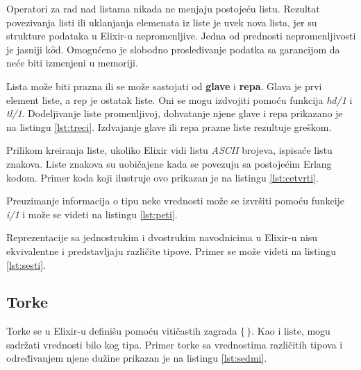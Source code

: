 \documentclass[12pt,oneside]{memoir}
\begin{document}


Operatori za rad nad listama nikada ne menjaju postojeću listu. Rezultat povezivanja listi ili uklanjanja elemenata iz liste je uvek nova lista, jer su strukture podataka u Elixir-u nepromenljive. Jedna od prednosti nepromenljivosti je jasniji k$\hat{o}$d. Omogućeno je slobodno prosleđivanje podatka sa garancijom da neće biti izmenjeni u memoriji.

Lista može biti prazna ili se može sastojati od \textbf{glave} i \textbf{repa}. Glava je prvi element liste, a rep je ostatak liste. Oni se mogu izdvojiti pomoću funkcija \textit{hd/1} i \textit{tl/1}. Dodeljivanje liste promenljivoj, dohvatanje njene glave i repa prikazano je na listingu \ref{lst:treci}. Izdvajanje glave ili repa prazne liste rezultuje greškom.



Prilikom kreiranja liste, ukoliko Elixir vidi listu \textit{ASCII} brojeva, ispisaće listu znakova. Liste znakova su uobičajene kada se povezuju sa postojećim Erlang kodom. Primer koda koji ilustruje ovo prikazan je na listingu \ref{lst:cetvrti}.



 

Preuzimanje informacija o tipu neke vrednosti može se izvršiti pomoću funkcije \textit{i/1} i može se videti na listingu \ref{lst:peti}.



Reprezentacije sa jednostrukim i dvostrukim navodnicima u Elixir-u nisu ekvivalentne i predstavljaju različite tipove. Primer se može videti na listingu \ref{lst:sesti}.



\subsection{Torke}

Torke se u Elixir-u definišu pomoću vitičastih zagrada $\{\,\}$. Kao i liste, mogu sadržati vrednosti bilo kog tipa. Primer torke sa vrednostima različitih tipova i određivanjem njene dužine prikazan je na listingu \ref{lst:sedmi}.
\end{document}
